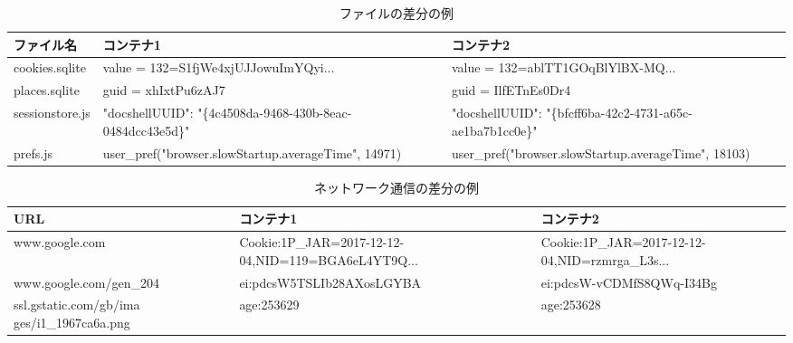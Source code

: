\documentclass[submit]{ipsj}
\begin{document}
\begin{table}[ht]



\caption{ファイルの差分の例}
\centering

\begin{tabular}{ |l|p{6cm}|p{6cm}| }

 \hline
 \footnotesize{ファイル名}　&\footnotesize{コンテナ1}　&\footnotesize{コンテナ2}\\
 \hline
 \footnotesize{cookies.sqlite} & \footnotesize{value = 132=S1fjWe4xjUJJowuImYQyi...} & \footnotesize{value = 132=ablTT1GOqBlYlBX-MQ...}\\
\hline
 \footnotesize{places.sqlite} & \footnotesize{guid = xhIxtPu6zAJ7} & \footnotesize{guid = IlfETnEs0Dr4}\\
\hline
 \footnotesize{sessionstore.js} & \footnotesize{"docshellUUID": "\{4c4508da-9468-430b-8eac- 0484dcc43e5d\}"} & \footnotesize{"docshellUUID": "\{bfcff6ba-42c2-4731-a65c- ae1ba7b1cc0e\}"}\\
 \hline
\footnotesize{prefs.js} & \footnotesize{user\_pref("browser.slowStartup.averageTime", 14971)} & \footnotesize{user\_pref("browser.slowStartup.averageTime", 18103)}\\
\hline
\end{tabular}
\label{fig:data}
\end{table}

\begin{table}[ht]
\caption{ネットワーク通信の差分の例}
\centering

\begin{tabular}{ |p{3.5cm}|p{5cm}|p{5cm}| }

 \hline
 URL　&コンテナ1　&\footnotesize{コンテナ2}\\
 \hline
 \footnotesize{www.google.com} & \footnotesize{Cookie:1P\_JAR=2017-12-12-04,NID=119=BGA6eL4YT9Q...} & \footnotesize{Cookie:1P\_JAR=2017-12-12-04,NID=rzmrga\_L3s...}\\
\hline
 \footnotesize{www.google.com/gen\_204} & \footnotesize{ei:pdcsW5TSLIb28AXosLGYBA} & \footnotesize{ei:pdcsW-vCDMfS8QWq-I34Bg}\\
\hline
 \footnotesize{ssl.gstatic.com/gb/ima ges/i1\_1967ca6a.png} & \footnotesize{age:253629} & \footnotesize{age:253628}\\
 \hline

\end{tabular}
\label{fig:data}
\end{table}
\end{document}
